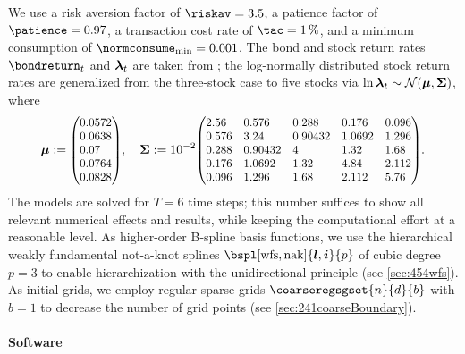 We use
a risk aversion factor of $\riskav = 3.5$,
a patience factor of $\patience = 0.97$,
a transaction cost rate of $\tac = \SI{1}{\percent}$, and
a minimum consumption of $\normconsume_{\min} = 0.001$.
The bond and stock return rates $\bondreturn_t$ and ${\boldsymbol{\lambda}}_t$
are taken from \cite{Cai10Stable};
the log-normally distributed stock return rates are generalized
from the three-stock case to five stocks via
$\ln {\boldsymbol{\lambda}}_t \sim \mathcal{N}({\boldsymbol{\mu}}, {\boldsymbol{\Sigma}})$, where
{%
  \setlength{\abovedisplayskip}{6pt}%
  \setlength{\belowdisplayskip}{6pt}%
  \begin{equation}
    \label{eq:financeStockReturnMeanCovariance}
    \*\mu
    :=
    \scalebox{0.92}{$
      \begin{pmatrix*}[l]
        0.0572\\
        0.0638\\
        0.07\\
        0.0764\\
        0.0828
      \end{pmatrix*}
    $},\quad
    \mat{\Sigma}
    := 10^{-2}
    \scalebox{0.92}{$
      \begin{pmatrix*}[l]
        2.56&  0.576&   0.288&   0.176&  0.096\\
        0.576& 3.24&    0.90432& 1.0692& 1.296\\
        0.288& 0.90432& 4&       1.32&   1.68\\
        0.176& 1.0692&  1.32&    4.84&   2.112\\
        0.096& 1.296&   1.68&    2.112&  5.76
      \end{pmatrix*}
    $}.
  \end{equation}%
}%
The models are solved for $T = 6$ time steps;
this number suffices to show all relevant numerical effects and results,
while keeping the computational effort at a reasonable level.
As higher-order B-spline basis functions,
we use the hierarchical weakly fundamental not-a-knot splines
$\bspl[\wfs,\nak]{\*l,\*i}{p}$ of cubic degree $p = 3$
to enable hierarchization with the unidirectional principle
(see \cref{sec:454wfs}).
As initial grids, we employ regular sparse grids
$\coarseregsgset{n}{d}{b}$ with $b = 1$
to decrease the number of grid points
(see \cref{sec:241coarseBoundary}).

\vspace*{-0.5em}

\paragraph{Software}


